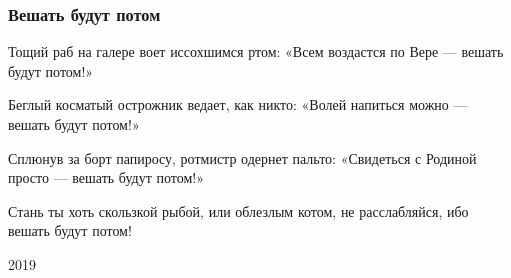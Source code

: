  
 
 

\subsubsection{Вешать будут потом}
\label{sec:poetry.rus.dnr.vladislav_rusanov.veshat_budut_potom}

Тощий раб на галере
воет иссохшимся ртом:
«Всем воздастся по Вере —
вешать будут потом!»

Беглый косматый острожник
ведает, как никто:
«Волей напиться можно —
вешать будут потом!»

Сплюнув за борт папиросу,
ротмистр одернет пальто:
«Свидеться с Родиной просто —
вешать будут потом!»

Стань ты хоть скользкой рыбой,
или облезлым котом,
не расслабляйся, ибо
вешать будут потом!

2019
